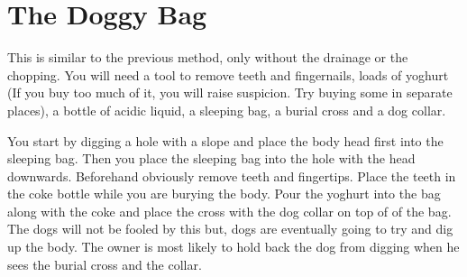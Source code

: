 \section*{The Doggy Bag}

This is similar to the previous method, only without the drainage or the 
chopping. You will need a tool to remove teeth and fingernails, loads of yoghurt 
(If you buy too much of it, you will raise suspicion. Try buying some in 
separate places), a bottle of acidic liquid, a sleeping bag, a burial cross and 
a dog collar.

You start by digging a hole with a slope and place the body head first into the 
sleeping bag. Then you place the sleeping bag into the hole with the head 
downwards. Beforehand obviously remove teeth and fingertips. Place the teeth in 
the coke bottle while you are burying the body. Pour the yoghurt into the bag 
along with the coke and place the cross with the dog collar on top of of the 
bag. The dogs will not be fooled by this but, dogs are eventually going to try 
and dig up the body.  The owner is most likely to hold back the dog from digging 
when he sees the burial cross and the collar.